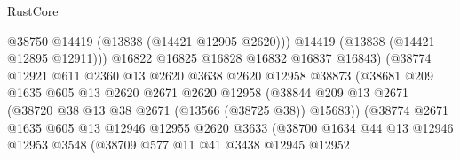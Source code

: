 \begin{lexlean}{RustCore}
\begin{coremodule}
                                      @38750
                                      @14419
                                      (@13838 (@14421 @12905 @2620)))
                                    @14419
                                    (@13838 (@14421 @12895 @12911)))
                                  @16822
                                  @16825
                                  @16828
                                  @16832
                                  @16837
                                  @16843)
                                (@38774
                                  @12921
                                  @611
                                  @2360
                                  @13
                                  @2620
                                  @3638
                                  @2620
                                  @12958
                                  @38873
                                  (@38681
                                    @209
                                    @1635
                                    @605
                                    @13
                                    @2620
                                    @2671
                                    @2620
                                    @12958
                                    (@38844
                                      @209
                                      @13
                                      @2671
                                      (@38720 @38 @13 @38 @2671 (@13566 (@38725 @38)) @15683))
                                    (@38774
                                      @2671
                                      @1635
                                      @605
                                      @13
                                      @12946
                                      @12955
                                      @2620
                                      @3633
                                      (@38700
                                        @1634
                                        @44
                                        @13
                                        @12946
                                        @12953
                                        @3548
                                        (@38709
                                          @577
                                          @11
                                          @41
                                          @3438
                                          @12945
                                          @12952

\end{coremodule}
\end{lexlean}
